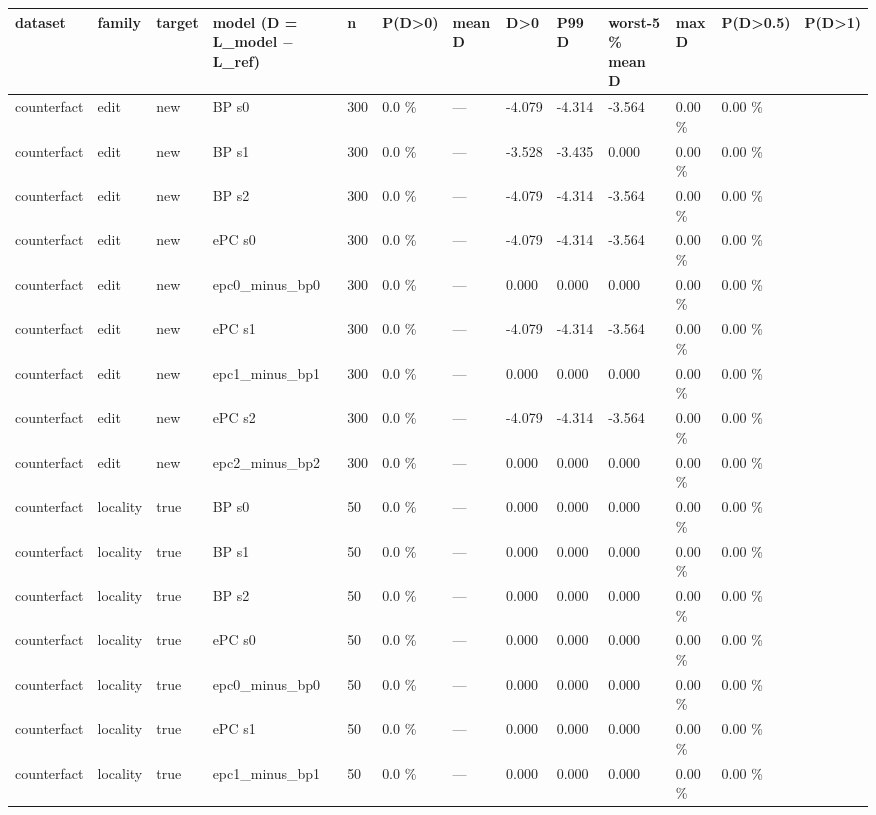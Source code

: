 \documentclass[10pt,a4paper]{article}
\begin{document}
\begin{center}\tiny
\begin{tabularx}{\textwidth}{@{}p{}XXXXXXXXXXXX@{}}
\toprule
dataset & family & target & model (D = L\_model $-$ L\_ref) & n & P(D>0) & mean D & D>0 & P99 D & worst-5 \% mean D & max D & P(D>0.5) & P(D>1) \\ \midrule
counterfact & edit & new & BP s0 & 300 & 0.0 \% & — & -4.079 & -4.314 & -3.564 & 0.00 \% & 0.00 \% &  \\
counterfact & edit & new & BP s1 & 300 & 0.0 \% & — & -3.528 & -3.435 & 0.000 & 0.00 \% & 0.00 \% &  \\
counterfact & edit & new & BP s2 & 300 & 0.0 \% & — & -4.079 & -4.314 & -3.564 & 0.00 \% & 0.00 \% &  \\
counterfact & edit & new & ePC s0 & 300 & 0.0 \% & — & -4.079 & -4.314 & -3.564 & 0.00 \% & 0.00 \% &  \\
counterfact & edit & new & epc0\_minus\_bp0 & 300 & 0.0 \% & — & 0.000 & 0.000 & 0.000 & 0.00 \% & 0.00 \% &  \\
counterfact & edit & new & ePC s1 & 300 & 0.0 \% & — & -4.079 & -4.314 & -3.564 & 0.00 \% & 0.00 \% &  \\
counterfact & edit & new & epc1\_minus\_bp1 & 300 & 0.0 \% & — & 0.000 & 0.000 & 0.000 & 0.00 \% & 0.00 \% &  \\
counterfact & edit & new & ePC s2 & 300 & 0.0 \% & — & -4.079 & -4.314 & -3.564 & 0.00 \% & 0.00 \% &  \\
counterfact & edit & new & epc2\_minus\_bp2 & 300 & 0.0 \% & — & 0.000 & 0.000 & 0.000 & 0.00 \% & 0.00 \% &  \\
counterfact & locality & true & BP s0 & 50 & 0.0 \% & — & 0.000 & 0.000 & 0.000 & 0.00 \% & 0.00 \% &  \\
counterfact & locality & true & BP s1 & 50 & 0.0 \% & — & 0.000 & 0.000 & 0.000 & 0.00 \% & 0.00 \% &  \\
counterfact & locality & true & BP s2 & 50 & 0.0 \% & — & 0.000 & 0.000 & 0.000 & 0.00 \% & 0.00 \% &  \\
counterfact & locality & true & ePC s0 & 50 & 0.0 \% & — & 0.000 & 0.000 & 0.000 & 0.00 \% & 0.00 \% &  \\
counterfact & locality & true & epc0\_minus\_bp0 & 50 & 0.0 \% & — & 0.000 & 0.000 & 0.000 & 0.00 \% & 0.00 \% &  \\
counterfact & locality & true & ePC s1 & 50 & 0.0 \% & — & 0.000 & 0.000 & 0.000 & 0.00 \% & 0.00 \% &  \\
counterfact & locality & true & epc1\_minus\_bp1 & 50 & 0.0 \% & — & 0.000 & 0.000 & 0.000 & 0.00 \% & 0.00 \% &  \\

\end{tabularx}
\end{center}
\end{document}
